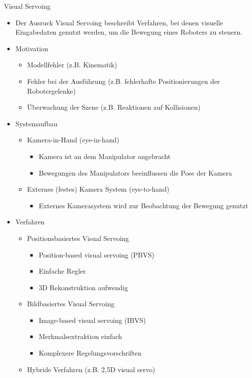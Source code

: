 \documentclass[paper=a4, fontsize=11pt]{scrartcl} %
\numberwithin{equation}{section} %
\numberwithin{figure}{section} %
\numberwithin{table}{section} %
\begin{document}
Visual Servoing
\begin{itemize}
\item Der Ausruck Visual Servoing beschreibt Verfahren, bei denen visuelle Eingabedaten genutzt werden, um die Bewegung eines Roboters zu steuern.
\item Motivation
\begin{itemize}
\item Modellfehler (z.B. Kinematik)
\item Fehler bei der Ausführung (z.B. fehlerhafte Positionierungen der Robotergelenke)
\item Überwachung der Szene (z.B. Reaktionen auf Kollisionen)
\end{itemize}
\item Systemaufbau
\begin{itemize}
\item Kamera-in-Hand (eye-in-hand)
\begin{itemize}
\item Kamera ist an dem Manipulator angebracht
\item Bewegungen des Manipulators beeinflussen die Pose der Kamera
\end{itemize}
\item Externes (festes) Kamera System (eye-to-hand)
\begin{itemize}
\item Externes Kamerasystem wird zur Beobachtung der Bewegung genutzt
\end{itemize}
\end{itemize}
\item Verfahren
\begin{itemize}
\item Positionsbasiertes Visual Servoing
\begin{itemize}
\item Position-based visual servoing (PBVS)
\item Einfache Regler
\item 3D Rekonstruktion aufwendig
\end{itemize}
\item Bildbasiertes Visual Servoing
\begin{itemize}
\item Image-based visual servoing (IBVS)
\item Merkmalsextraktion einfach
\item Komplexere Regelungsvorschriften
\end{itemize}
\item Hybride Verfahren (z.B. 2,5D visual servo)
\end{itemize}
\end{itemize}
\end{document}

